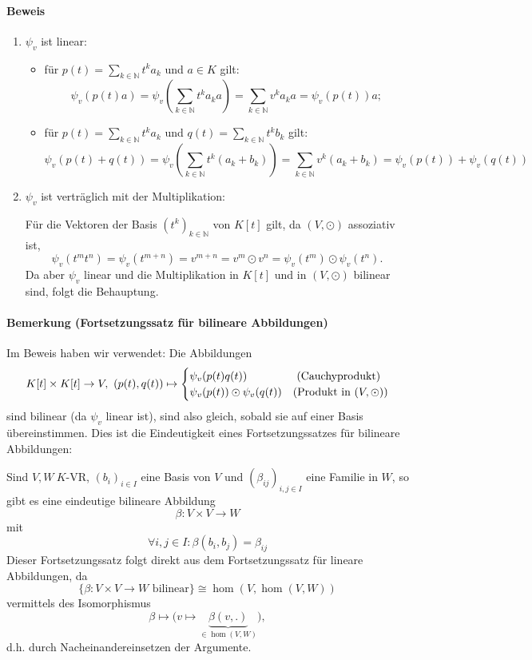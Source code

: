 \paragraph{Beweis}
	\begin{enumerate}
		\item $ \psi_v $ ist linear:
			\begin{itemize}
				\item für $ p(t) = \sum_{k\in\mathbb{N}} t^ka_k $ und $ a\in K $ gilt:
					\[ \psi_v(p(t)a) = \psi_v(\sum_{k\in\mathbb{N}} t^ka_ka) = \sum_{k\in\mathbb{N}} v^ka_ka = \psi_v(p(t))a; \]
				\item für $ p(t) = \sum_{k\in\mathbb{N}} t^ka_k $ und $ q(t) = \sum_{k\in\mathbb{N}} t^k b_k $ gilt:
					\[ \psi_v(p(t)+q(t)) = \psi_v(\sum_{k\in\mathbb{N}}t^k(a_k+b_k)) = \sum_{k\in\mathbb{N}} v^k(a_k+b_k) = \psi_v(p(t))+\psi_v(q(t)) \]
			\end{itemize}
		\item $ \psi_v $ ist verträglich mit der Multiplikation:
		
			Für die Vektoren der Basis $ (t^k)_{k\in\mathbb{N}} $ von $ K[t] $ gilt, da $ (V,\odot) $ assoziativ ist,
				\[ \psi_v(t^mt^n) = \psi_v(t^{m+n}) = v^{m+n} = v^m\odot v^n = \psi_v(t^m)\odot \psi_v(t^n). \]
			Da aber $ \psi_v $ linear und die Multiplikation in $ K[t] $ und in $ (V,\odot) $ bilinear sind, folgt die Behauptung.
	\end{enumerate}
\paragraph{Bemerkung (Fortsetzungssatz für bilineare Abbildungen)}
	Im Beweis haben wir verwendet: Die Abbildungen
		\[ K[t]\times K[t]\to V,\ (p(t),q(t))\mapsto
			\begin{cases}
			\psi_v(p(t)q(t))& \text{ (Cauchyprodukt)}\\
			\psi_v(p(t))\odot \psi_v(q(t)) & \text{(Produkt in $ (V,\odot) $)}
			\end{cases} \]
	sind bilinear (da $ \psi_v $ linear ist), sind also gleich, sobald sie auf einer Basis übereinstimmen.
	Dies ist die Eindeutigkeit eines Fortsetzungssatzes für bilineare Abbildungen:
	
	Sind $ V,W\ K$-VR, $ (b_i)_{i\in I} $ eine Basis von $ V $ und $ (\beta_{ij})_{i,j\in I} $ eine Familie in $ W $, so gibt es eine eindeutige bilineare Abbildung
		\[ \beta: V\times V\to W \]
	mit
		\[ \forall i,j\in I: \beta(b_i,b_j) = \beta_{ij} \]
	Dieser Fortsetzungssatz folgt direkt aus dem Fortsetzungssatz für lineare Abbildungen, da
		\[ \{\beta:V\times V\to W \text{ bilinear}\} \cong \hom(V,\hom(V,W))\]
	vermittels des Isomorphismus
		\[ \beta \mapsto \big(v\mapsto\underset{\in \hom(V,W)}{\underbrace{\beta(v,.)}}\big), \]
	d.h. durch Nacheinandereinsetzen der Argumente.
